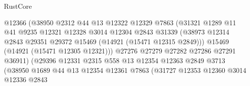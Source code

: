 \begin{lexlean}{RustCore}
\begin{coremodule}
                                    @12366
                                    (@38950
                                      @2312
                                      @44
                                      @13
                                      @12322
                                      @12329
                                      @7863
                                      (@31321
                                        @1289
                                        @11
                                        @41
                                        @9235
                                        @12321
                                        @12328
                                        @3014
                                        @12304
                                        @2843
                                        @31339
                                        (@38973
                                          @12314
                                          @2843
                                          @29351
                                          @29372
                                          @15469
                                          (@14921 (@15471 @12315 @2849)))
                                        @15469
                                        (@14921 (@15471 @12305 @12321)))
                                      @27276
                                      @27279
                                      @27282
                                      @27286
                                      @27291
                                      @36911)
                                    (@29396
                                      @12331
                                      @2315
                                      @558
                                      @13
                                      @12354
                                      @12363
                                      @2849
                                      @3713
                                      (@38950
                                        @1689
                                        @44
                                        @13
                                        @12354
                                        @12361
                                        @7863
                                        (@31727
                                          @12353
                                          @12360
                                          @3014
                                          @12336
                                          @2843

\end{coremodule}
\end{lexlean}
